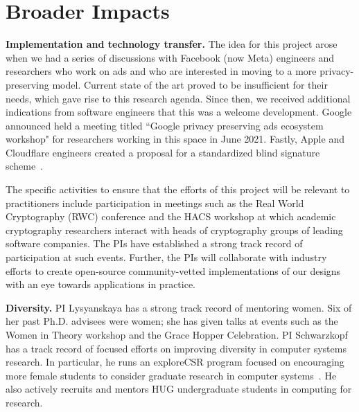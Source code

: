 \section{Broader Impacts}
\noindent\textbf{Implementation and technology transfer.}  
The idea for this project arose when we had a series of discussions with Facebook (now Meta) engineers and researchers who work on ads and who are interested in moving to a more privacy-preserving model.  Current state of the art proved to be insufficient for their needs, which gave rise to this research agenda.
%
Since then, we received additional indications from software engineers that this was a welcome development.  Google announced held a meeting titled ``Google privacy preserving ads ecosystem workshop" for researchers working in this space in June 2021.  Fastly, Apple and Cloudflare engineers created a proposal for a standardized blind signature scheme~\cite{ietf:djw21,ietf:djw22}.  


The specific activities to ensure that the efforts of this project will be relevant to practitioners include participation in meetings such as the Real World Cryptography (RWC) conference and the HACS workshop at which academic cryptography researchers interact with heads of cryptography groups of leading software companies.  The PIs have established a strong track record of participation at such events.%
Further, the PIs will collaborate with industry efforts to create open-source community-vetted implementations of our designs with an eye towards applications in practice.  

\noindent\textbf{Diversity.} PI Lysyanskaya has a strong track record of mentoring women. Six of her past Ph.D. advisees were women; she has given talks at events such as the Women in Theory workshop and the Grace Hopper Celebration.%
PI Schwarzkopf has a track record of focused efforts on improving diversity in computer systems research. In particular, he runs an exploreCSR program focused on encouraging more female students to consider graduate research in computer systems~\cite{explorecsr-systems}. He also actively recruits and mentors HUG undergraduate students in computing for research.%

